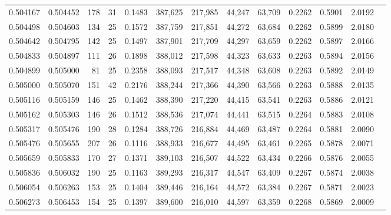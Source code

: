 \begin{tabular}{rrrrrrrrrrrrr}
0.504167 & 0.504452 &    178 &    31 &                                     0.1483 & 387,625 & 217,985 &  44,247 &  63,709 & 0.2262 & 0.5901 & 2.0192 \\
0.504498 & 0.504603 &    134 &    25 &                                     0.1572 & 387,759 & 217,851 &  44,272 &  63,684 & 0.2262 & 0.5899 & 2.0180 \\
0.504642 & 0.504795 &    142 &    25 &                                     0.1497 & 387,901 & 217,709 &  44,297 &  63,659 & 0.2262 & 0.5897 & 2.0166 \\
0.504833 & 0.504897 &    111 &    26 &                                     0.1898 & 388,012 & 217,598 &  44,323 &  63,633 & 0.2263 & 0.5894 & 2.0156 \\
0.504899 & 0.505000 &     81 &    25 &                                     0.2358 & 388,093 & 217,517 &  44,348 &  63,608 & 0.2263 & 0.5892 & 2.0149 \\
0.505000 & 0.505070 &    151 &    42 &                                     0.2176 & 388,244 & 217,366 &  44,390 &  63,566 & 0.2263 & 0.5888 & 2.0135 \\
0.505116 & 0.505159 &    146 &    25 &                                     0.1462 & 388,390 & 217,220 &  44,415 &  63,541 & 0.2263 & 0.5886 & 2.0121 \\
0.505162 & 0.505303 &    146 &    26 &                                     0.1512 & 388,536 & 217,074 &  44,441 &  63,515 & 0.2264 & 0.5883 & 2.0108 \\
0.505317 & 0.505476 &    190 &    28 &                                     0.1284 & 388,726 & 216,884 &  44,469 &  63,487 & 0.2264 & 0.5881 & 2.0090 \\
0.505476 & 0.505655 &    207 &    26 &                                     0.1116 & 388,933 & 216,677 &  44,495 &  63,461 & 0.2265 & 0.5878 & 2.0071 \\
0.505659 & 0.505833 &    170 &    27 &                                     0.1371 & 389,103 & 216,507 &  44,522 &  63,434 & 0.2266 & 0.5876 & 2.0055 \\
0.505836 & 0.506032 &    190 &    25 &                                     0.1163 & 389,293 & 216,317 &  44,547 &  63,409 & 0.2267 & 0.5874 & 2.0038 \\
0.506054 & 0.506263 &    153 &    25 &                                     0.1404 & 389,446 & 216,164 &  44,572 &  63,384 & 0.2267 & 0.5871 & 2.0023 \\
0.506273 & 0.506453 &    154 &    25 &                                     0.1397 & 389,600 & 216,010 &  44,597 &  63,359 & 0.2268 & 0.5869 & 2.0009 \\

\end{tabular}
